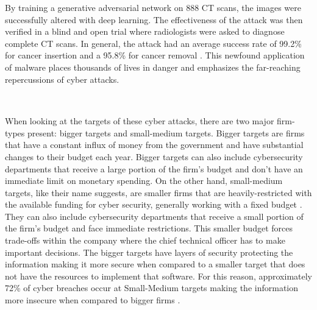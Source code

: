 By training a generative adversarial network on 888 CT scans, the images were successfully altered with deep learning. The effectiveness of the attack was then verified in a blind and open trial where radiologists were asked to diagnose complete CT scans. In general, the attack had an average success rate of 99.2\% for cancer insertion and a 95.8\% for cancer removal \cite{mirsky_ct-gan_2019}. This newfound application of malware places thousands of lives in danger and emphasizes the far-reaching repercussions of cyber attacks.

\subsection*{\color{SubSectionBlue}{Two Targets}}
 \\

When looking at the targets of these cyber attacks, there are two major firm-types present: bigger targets and small-medium targets. Bigger targets are firms that have a constant influx of money from the government and have substantial changes to their budget each year. Bigger targets can also include cybersecurity departments that receive a large portion of the firm’s budget and don’t have an immediate limit on monetary spending. On the other hand, small-medium targets, like their name suggests, are smaller firms that are heavily-restricted with the available funding for cyber security, generally working with a fixed budget \cite{fielder_decision_2016}. They can also include cybersecurity departments that receive a small portion of the firm’s budget and face immediate restrictions. This smaller budget forces trade-offs within the company where the chief technical officer has to make important decisions. The bigger targets have layers of security protecting the information making it more secure when compared to a smaller target that does not have the resources to implement that software. For this reason, approximately 72\% of cyber breaches occur at Small-Medium targets making the information more insecure when compared to bigger firms \cite{fielder_decision_2016}.  
\vspace{1mm}

